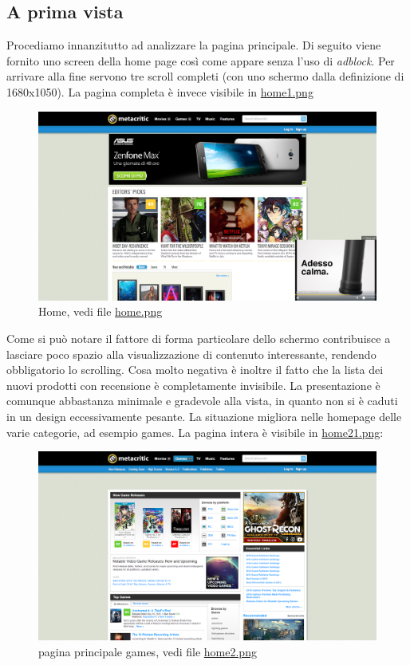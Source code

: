 \documentclass[12pt]{article}
\begin{document}
\subsection{A prima vista}
Procediamo innanzitutto ad analizzare la pagina principale. Di seguito viene fornito uno screen della home page così come appare senza l'uso di \textit{adblock}. Per arrivare alla fine servono tre scroll completi (con uno schermo dalla definizione di 1680x1050). La pagina completa è invece visibile in \href{home1.png}{home1.png}
\begin{figure}[H]
\begin{center}
\includegraphics[width=13.5cm]{home.png}
\caption{Home, vedi file \href{home.png}{home.png}}
\end{center}
\end{figure}
Come si può notare il fattore di forma particolare dello schermo contribuisce a lasciare poco spazio alla visualizzazione di contenuto interessante, rendendo obbligatorio lo scrolling. Cosa molto negativa è inoltre il fatto che la lista dei nuovi prodotti con recensione è completamente invisibile.
La presentazione è comunque abbastanza minimale e gradevole alla vista, in quanto non si è caduti in un design eccessivamente pesante.
La situazione migliora nelle homepage delle varie categorie, ad esempio games. La pagina intera è visibile in \href{home21.png}{home21.png}:
\begin{figure}[H]
	\begin{center}
		\includegraphics[width=13.5cm]{home2.png}
		\caption{pagina principale games, vedi file \href{home2.png}{home2.png}}
	\end{center}
\end{figure}
\end{document}
